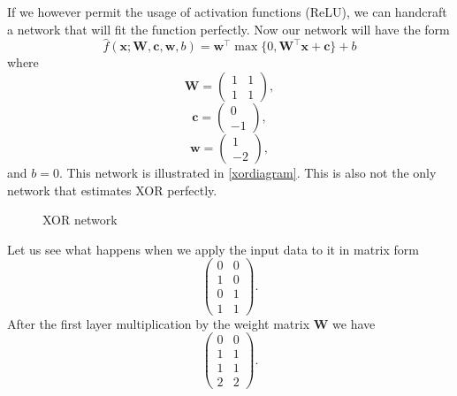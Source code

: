 If we however permit the usage of activation functions (ReLU), we can handcraft a network that will fit the function perfectly. Now our network will have the form 
$$\widehat{f}(\textbf{x};\textbf{W},\textbf{c},\textbf{w},b)=\textbf{w}^\top \max\{0,\textbf{W}^\top\textbf{x}+\textbf{c}\}+b$$ 
where 
$$\textbf{W}=
\left(\begin{matrix}
	1 & 1\\
	1 & 1
\end{matrix}\right),$$
$$\textbf{c}=
\left(\begin{matrix}
	0\\
	-1
\end{matrix}\right),$$
$$\textbf{w}=
\left(\begin{matrix}
	1\\
	-2
\end{matrix}\right),$$
and $b=0$. This network is illustrated in \autoref{xordiagram}. This is also not the only network that estimates XOR perfectly.
\begin{figure}[h]
\caption{XOR network}
\center
\label{xordiagram}
\end{figure}

Let us see what happens when we apply the input data to it in matrix form $$
\left(\begin{matrix}
	0 & 0\\
	1 & 0\\
	0 & 1\\
	1 & 1
\end{matrix}\right).$$
After the first layer multiplication by the weight matrix $\textbf{W}$ we have
$$\left(\begin{matrix}
	0 & 0\\
	1 & 1\\
	1 & 1\\
	2 & 2
\end{matrix}\right).$$

